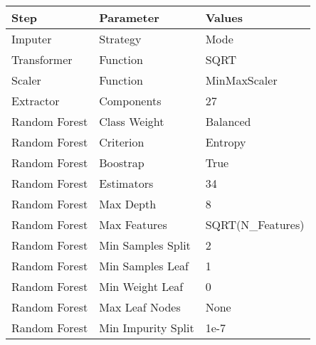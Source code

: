 \begin{tabular}{lll} \toprule
Step            & Parameter             & Values                        \\ \midrule
Imputer         & Strategy              & Mode                          \\
Transformer     & Function              & SQRT                          \\
Scaler          & Function              & MinMaxScaler                  \\
Extractor       & Components            & 27                            \\
Random Forest   & Class Weight          & Balanced                      \\
Random Forest   & Criterion             & Entropy                       \\
Random Forest   & Boostrap              & True                          \\
Random Forest   & Estimators            & 34                            \\
Random Forest   & Max Depth             & 8                             \\
Random Forest   & Max Features          & SQRT(N\_Features)             \\
Random Forest   & Min Samples Split     & 2                             \\
Random Forest   & Min Samples Leaf      & 1                             \\
Random Forest   & Min Weight Leaf       & 0                             \\
Random Forest   & Max Leaf Nodes        & None                          \\
Random Forest   & Min Impurity Split    & 1e-7                          \\
\bottomrule \end{tabular}
